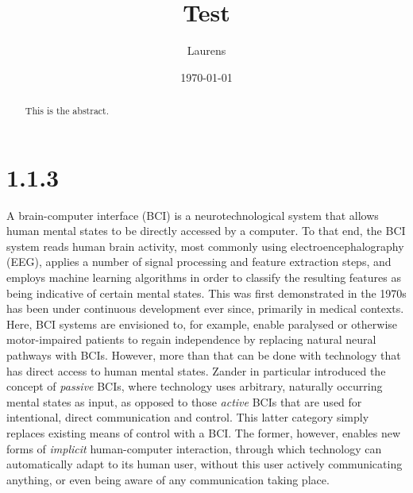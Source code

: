 \documentclass[a4paper]{article}
\begin{document}
\title{Test}
\date{\today}
\author{Laurens}

\maketitle

\begin{abstract}
This is the abstract.
\end{abstract}


\section*{1.1.3}

A brain-computer interface (BCI) is a neurotechnological system that allows human mental states to be directly accessed by a computer. To that end, the BCI system reads human brain activity, most commonly using electroencephalography (EEG), applies a number of signal processing and feature extraction steps, and employs machine learning algorithms in order to classify the resulting features as being indicative of certain mental states. This was first demonstrated in the 1970s has been under continuous development ever since, primarily in medical contexts. Here, BCI systems are envisioned to, for example, enable paralysed or otherwise motor-impaired patients to regain independence by replacing natural neural pathways with BCIs. However, more than that can be done with technology that has direct access to human mental states. Zander in particular introduced the concept of \emph{passive} BCIs, where technology uses arbitrary, naturally occurring mental states as input, as opposed to those \emph{active} BCIs that are used for intentional, direct communication and control. This latter category simply replaces existing means of control with a BCI. The former, however, enables new forms of \emph{implicit} human-computer interaction, through which technology can automatically adapt to its human user, without this user actively communicating anything, or even being aware of any communication taking place.
\end{document}
